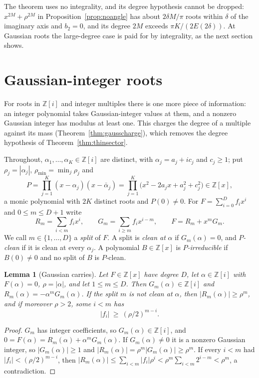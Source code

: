 \documentclass[11pt]{article}
\newtheorem{lemma}[theorem]{Lemma}
\begin{document}
The theorem uses no integrality, and its degree hypothesis cannot be
dropped: $x^{2M}+\rho^{2M}$ in Proposition~\ref{prop:noangle} has about
$2\delta M/\pi$ roots within $\delta$ of the imaginary axis and
$b_2=0$, and its degree $2M$ exceeds $\pi K/(2E(2\delta))$.  At Gaussian roots
the large-degree case is paid for by integrality, as the next section shows.


\section{Gaussian-integer roots}\label{sec:gaussian}

For roots in $\mathbb Z[i]$ and integer multiples there is one more piece of
information: an integer polynomial takes Gaussian-integer values at them,
and a nonzero Gaussian integer has modulus at least one.  This charges the
degree of a multiple against its mass (Theorem~\ref{thm:gausscharge}), which
removes the degree hypothesis of Theorem~\ref{thm:thinsector}.

Throughout, $\alpha_1,\ldots,\alpha_K\in\mathbb Z[i]$ are distinct, with
$\alpha_j=a_j+ic_j$ and $c_j\ge1$; put $\rho_j=|\alpha_j|$,
$\rho_{\min}=\min_j\rho_j$ and
\[
  P=\prod_{j=1}^K(x-\alpha_j)(x-\bar\alpha_j)
   =\prod_{j=1}^K\bigl(x^2-2a_jx+a_j^2+c_j^2\bigr)\in\mathbb Z[x],
\]
a monic polynomial with $2K$ distinct roots and $P(0)\ne0$.  For
$F=\sum_{i=0}^Df_ix^i$ and $0\le m\le D+1$ write
\[
  R_m=\sum_{i<m}f_ix^i,\qquad G_m=\sum_{i\ge m}f_ix^{i-m},\qquad
  F=R_m+x^mG_m .
\]
We call $m\in\{1,\ldots,D\}$ a \emph{split} of $F$.  A split is \emph{clean
at} $\alpha$ if $G_m(\alpha)=0$, and \emph{$P$-clean} if it is clean at every
$\alpha_j$.  A polynomial $B\in\mathbb Z[x]$ is \emph{$P$-irreducible} if
$B(0)\ne0$ and no split of $B$ is $P$-clean.

\begin{lemma}[Gaussian carries]\label{lem:gausscarry}
Let $F\in\mathbb Z[x]$ have degree $D$, let $\alpha\in\mathbb Z[i]$ with
$F(\alpha)=0$, $\rho=|\alpha|$, and let $1\le m\le D$.  Then
$G_m(\alpha)\in\mathbb Z[i]$ and $R_m(\alpha)=-\alpha^mG_m(\alpha)$.  If the
split $m$ is not clean at $\alpha$, then $|R_m(\alpha)|\ge\rho^m$, and if
moreover $\rho>2$, some $i<m$ has
\[
  |f_i|\ \ge\ (\rho/2)^{m-i}.
\]
\end{lemma}

\begin{proof}
$G_m$ has integer coefficients, so $G_m(\alpha)\in\mathbb Z[i]$, and
$0=F(\alpha)=R_m(\alpha)+\alpha^mG_m(\alpha)$.  If $G_m(\alpha)\ne0$ it is a
nonzero Gaussian integer, so $|G_m(\alpha)|\ge1$ and
$|R_m(\alpha)|=\rho^m|G_m(\alpha)|\ge\rho^m$.  If every $i<m$ had
$|f_i|<(\rho/2)^{m-i}$, then
$|R_m(\alpha)|\le\sum_{i<m}|f_i|\rho^i<\rho^m\sum_{i<m}2^{i-m}<\rho^m$, a
contradiction.
\end{proof}
\end{document}
